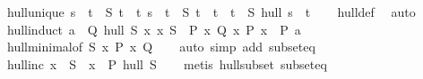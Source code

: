 \begin{isabellebody}
{\isafoldproof}%
%
\isadelimproof
\isanewline
%
\endisadelimproof
\isanewline
{}\isamarkupfalse%
\ hull{\isacharunderscore}{\kern0pt}unique{\isacharcolon}{\kern0pt}\ {\isachardoublequoteopen}s\ {\isasymsubseteq}\ t\ {\isasymLongrightarrow}\ S\ t\ {\isasymLongrightarrow}\ {\isacharparenleft}{\kern0pt}{\isasymAnd}t{\isacharprime}{\kern0pt}{\isachardot}{\kern0pt}\ s\ {\isasymsubseteq}\ t{\isacharprime}{\kern0pt}\ {\isasymLongrightarrow}\ S\ t{\isacharprime}{\kern0pt}\ {\isasymLongrightarrow}\ t\ {\isasymsubseteq}\ t{\isacharprime}{\kern0pt}{\isacharparenright}{\kern0pt}\ {\isasymLongrightarrow}\ {\isacharparenleft}{\kern0pt}S\ hull\ s\ {\isacharequal}{\kern0pt}\ t{\isacharparenright}{\kern0pt}{\isachardoublequoteclose}\isanewline
%
\isadelimproof
\ \ %
\endisadelimproof
%
\isatagproof
{}\isamarkupfalse%
\ hull{\isacharunderscore}{\kern0pt}def\ \isamarkupfalse%
\ auto%
\endisatagproof
{\isafoldproof}%
%
\isadelimproof
\isanewline
%
\endisadelimproof
\isanewline
{}\isamarkupfalse%
\ hull{\isacharunderscore}{\kern0pt}induct{\isacharcolon}{\kern0pt}\ {\isachardoublequoteopen}{\isasymlbrakk}a\ {\isasymin}\ Q\ hull\ S{\isacharsemicolon}{\kern0pt}\ {\isasymAnd}x{\isachardot}{\kern0pt}\ x{\isasymin}\ S\ {\isasymLongrightarrow}\ P\ x{\isacharsemicolon}{\kern0pt}\ Q\ {\isacharbraceleft}{\kern0pt}x{\isachardot}{\kern0pt}\ P\ x{\isacharbraceright}{\kern0pt}{\isasymrbrakk}\ {\isasymLongrightarrow}\ P\ a{\isachardoublequoteclose}\isanewline
%
\isadelimproof
\ \ %
\endisadelimproof
%
\isatagproof
{}\isamarkupfalse%
\ hull{\isacharunderscore}{\kern0pt}minimal{\isacharbrackleft}{\kern0pt}of\ S\ {\isachardoublequoteopen}{\isacharbraceleft}{\kern0pt}x{\isachardot}{\kern0pt}\ P\ x{\isacharbraceright}{\kern0pt}{\isachardoublequoteclose}\ Q{\isacharbrackright}{\kern0pt}\isanewline
\ \ \isamarkupfalse%
\ {\isacharparenleft}{\kern0pt}auto\ simp\ add{\isacharcolon}{\kern0pt}\ subset{\isacharunderscore}{\kern0pt}eq{\isacharparenright}{\kern0pt}%
\endisatagproof
{\isafoldproof}%
%
\isadelimproof
\isanewline
%
\endisadelimproof
\isanewline
{}\isamarkupfalse%
\ hull{\isacharunderscore}{\kern0pt}inc{\isacharcolon}{\kern0pt}\ {\isachardoublequoteopen}x\ {\isasymin}\ S\ {\isasymLongrightarrow}\ x\ {\isasymin}\ P\ hull\ S{\isachardoublequoteclose}\isanewline
%
\isadelimproof
\ \ %
\endisadelimproof
%
\isatagproof
{}\isamarkupfalse%
\ {\isacharparenleft}{\kern0pt}metis\ hull{\isacharunderscore}{\kern0pt}subset\ subset{\isacharunderscore}{\kern0pt}eq{\isacharparenright}{\kern0pt}%

\end{isabellebody}
